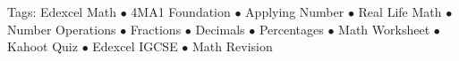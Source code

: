 \documentclass[11pt,a4paper]{article}
\begin{document}
\vspace{14pt}
\begin{center}
  \sffamily\scriptsize\textcolor{textmuted}{
    Tags: Edexcel Math $\bullet$ 4MA1 Foundation $\bullet$ Applying Number $\bullet$ Real Life Math $\bullet$ Number Operations $\bullet$ Fractions $\bullet$ Decimals $\bullet$ Percentages $\bullet$ Math Worksheet $\bullet$ Kahoot Quiz $\bullet$ Edexcel IGCSE $\bullet$ Math Revision
  }
\end{center}
\end{document}
